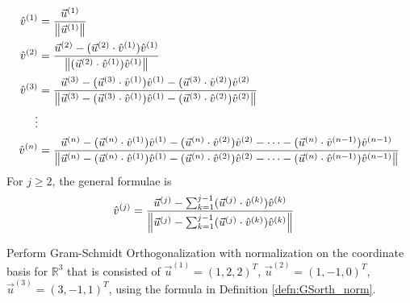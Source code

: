\begin{defn}
\label{defn:GSorth_norm}
\begin{align*}
\hat{v}^{(1)} &= \frac{\vec{u}^{(1)}}{\norm{\vec{u}^{(1)}}} \\
\hat{v}^{(2)} &= \frac{\vec{u}^{(2)} - (\vec{u}^{(2)} \cdot \hat{v}^{(1)})\hat{v}^{(1)}}{\norm{(\vec{u}^{(2)} \cdot \hat{v}^{(1)})\hat{v}^{(1)}}} \\
\hat{v}^{(3)} &= \frac{\vec{u}^{(3)} - (\vec{u}^{(3)} \cdot \hat{v}^{(1)})\hat{v}^{(1)} - (\vec{u}^{(3)} \cdot \hat{v}^{(2)})\hat{v}^{(2)}}{\norm{\vec{u}^{(3)} - (\vec{u}^{(3)} \cdot \hat{v}^{(1)})\hat{v}^{(1)} - (\vec{u}^{(3)} \cdot \hat{v}^{(2)})\hat{v}^{(2)}}} \\
\vdots \\
\hat{v}^{(n)} &= \frac{\vec{u}^{(n)} - (\vec{u}^{(n)} \cdot \hat{v}^{(1)})\hat{v}^{(1)} - (\vec{u}^{(n)} \cdot \hat{v}^{(2)})\hat{v}^{(2)} - \cdots - (\vec{u}^{(n)} \cdot \hat{v}^{(n-1)})\hat{v}^{(n-1)}}{\norm{\vec{u}^{(n)} - (\vec{u}^{(n)} \cdot \hat{v}^{(1)})\hat{v}^{(1)} - (\vec{u}^{(n)} \cdot \hat{v}^{(2)})\hat{v}^{(2)} - \cdots - (\vec{u}^{(n)} \cdot \hat{v}^{(n-1)})\hat{v}^{(n-1)}}} 
\end{align*}
For $j \geq 2$, the general formulae is
\begin{align*}
\hat{v}^{(j)} &= \frac{\vec{u}^{(j)} - \sum_{k=1}^{j-1}(\vec{u}^{(j)} \cdot \hat{v}^{(k)})\hat{v}^{(k)}}{\norm{\vec{u}^{(j)} - \sum_{k=1}^{j-1}(\vec{u}^{(j)} \cdot \hat{v}^{(k)})\hat{v}^{(k)}}}
\end{align*}
\end{defn}
\begin{exmp}
\label{exmp:GS_ex}
Perform Gram-Schmidt Orthogonalization with normalization on the coordinate basis for $\mathbb{R}^3$ that is consisted of $\vec{u}^{(1)} = (1,2,2)^T$, $\vec{u}^{(2)} = (1,-1,0)^T$, $\vec{u}^{(3)} = (3,-1,1)^T$, using the formula in Definition \ref{defn:GSorth_norm}.
\end{exmp}
